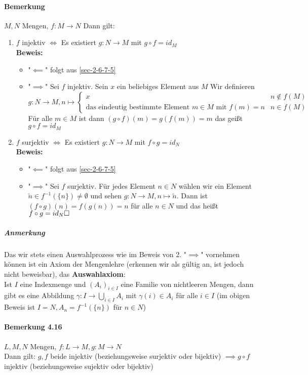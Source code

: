 \documentclass[a4paper]{scrartcl}
\theoremstyle{definition}
\theoremstyle{plain}
\theoremstyle{plain}
\theoremstyle{remark}
\theoremstyle{remark}
\theoremstyle{remark}
\theoremstyle{remark}
\theoremstyle{remark}
\begin{document}
\paragraph{Bemerkung}
\label{sec-2-6-7-7}
$M,N$ Mengen, $f:M\to N$ Dann gilt:
\begin{enumerate}
\item $f$ injektiv $\iff$ Es existiert $g:N\to M$ mit $g\circ f = id_M$ \\
        \textbf{Beweis:}
\begin{itemize}
\item "$\impliedby$" folgt aus \ref{sec-2-6-7-5}
\item "$\implies$" Sei $f$ injektiv. Sein $x$ ein beliebiges Element aus $M$
          Wir definieren \[g:N\to M,n\mapsto \begin{cases} x & n\not\in f(M) \\ \text{das eindeutig bestimmte Element $m\in M$ mit $f(m) = n$} & n\in f(M) \end{cases}\]
          Für alle $m\in M$ ist dann $(g\circ f)(m) = g(f(m)) = m$ das geißt $g\circ f = id_M$
\end{itemize}
\item $f$ surjektiv $\iff$ Es existiert $g:N\to M$ mit $f\circ g = id_N$ \\
        \textbf{Beweis:}
\begin{itemize}
\item "$\impliedby$" folgt aus \ref{sec-2-6-7-5}
\item "$\implies$" Sei $f$ surjektiv. Für jedes Element $n\in N$ wählen wir ein Element $\tilde n\in f^{-1}(\{n\}) \neq \emptyset$ und sehen
$g:N\to M,n\mapsto \tilde n$. Dann ist $(f\circ g)(n) = f(g(n)) = n$ für alle $n\in N$ und das heißt $f\circ g = id_N \hfill\square$
\end{itemize}
\end{enumerate}
\subparagraph{Anmerkung}
\label{sec-2-6-7-7-1}
Das wir stets einen Auswahlprozess wie im Beweis von 2. "$\implies$" vornehmen können ist ein Axiom der Mengenlehre (erkennen wir als gültig an, ist jedoch nicht beweisbar), das \textbf{Auswahlaxiom}: \\
      Ist $I$ eine Indexmenge und $(A_i)_{i\in I}$ eine Familie von nichtleeren Mengen, dann gibt es eine Abbildung $\gamma:I\to \bigcup_{i\in I} A_i$ mit $\gamma (i) \in A_i$ für alle $i\in I$ (im obigen Beweis ist $I = N,A_n = f^{-1}(\{n\})$ für $n\in N$)
\paragraph{Bemerkung 4.16}
\label{sec-2-6-7-8}
$L,M,N$ Mengen, $f:L\to M, g:M\to N$ \\
     Dann gilt: $g,f$ beide injektiv (beziehungsweise surjektiv oder bijektiv) $\implies g\circ f$ injektiv (beziehungsweise sujektiv oder bijektiv)
\end{document}
